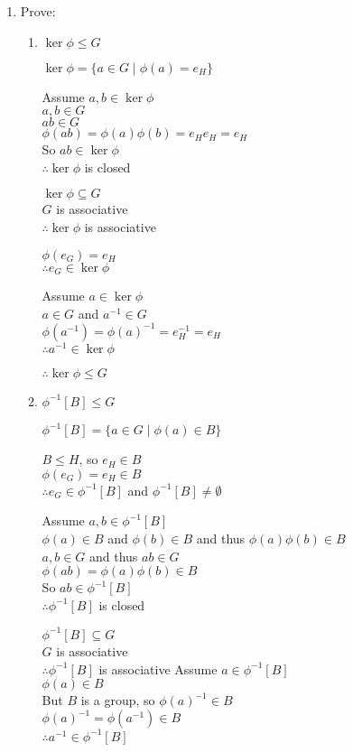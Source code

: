 \documentclass[letterpaper,12pt,fleqn]{article}
\newcommand{\p}{\phi}
\begin{document}
\begin{enumerate}[label=\alph*)]
\item Prove:
  \begin{enumerate}[label=\arabic*)]
  \item $\ker\p\le G$

    $\ker\p=\{a\in G\mid\p(a)=e_H\}$

    Assume $a,b\in\ker\p$ \\
    $a,b\in G$ \\
    $ab\in G$ \\
    $\p(ab)=\p(a)\p(b)=e_He_H=e_H$ \\
    So $ab\in\ker\p$ \\
    $\therefore\ker\p$ is closed

    $\ker\p\subseteq G$ \\
    $G$ is associative \\
    $\therefore\ker\p$ is associative

    $\p(e_G)=e_H$ \\
    $\therefore e_G\in\ker\p$

    Assume $a\in\ker\p$ \\
    $a\in G$ and $a^{-1}\in G$ \\
    $\p(a^{-1})=\p(a)^{-1}=e_H^{-1}=e_H$ \\
    $\therefore a^{-1}\in\ker\p$

    $\therefore\ker\p\le G$

  \item $\p^{-1}[B]\le G$
    
    $\p^{-1}[B]=\{a\in G\mid\p(a)\in B\}$

    $B\le H$, so $e_H\in B$ \\
    $\p(e_G)=e_H\in B$ \\
    $\therefore e_G\in\p^{-1}[B]$ and $\p^{-1}[B]\ne\emptyset$

    Assume $a,b\in\p^{-1}[B]$ \\
    $\p(a)\in B$ and $\p(b)\in B$ and thus $\p(a)\p(b)\in B$\\
    $a,b\in G$ and thus $ab\in G$ \\
    $\p(ab)=\p(a)\p(b)\in B$ \\
    So $ab\in\p^{-1}[B]$ \\
    $\therefore\p^{-1}[B]$ is closed

    $\p^{-1}[B]\subseteq G$ \\
    $G$ is associative \\
    $\therefore\p^{-1}[B]$ is associative
\newpage
    Assume $a\in\p^{-1}[B]$ \\
    $\p(a)\in B$ \\
    But $B$ is a group, so $\p(a)^{-1}\in B$ \\
    $\p(a)^{-1}=\p(a^{-1})\in B$ \\
    $\therefore a^{-1}\in\p^{-1}[B]$


\end{enumerate}
\end{enumerate}
\end{document}
